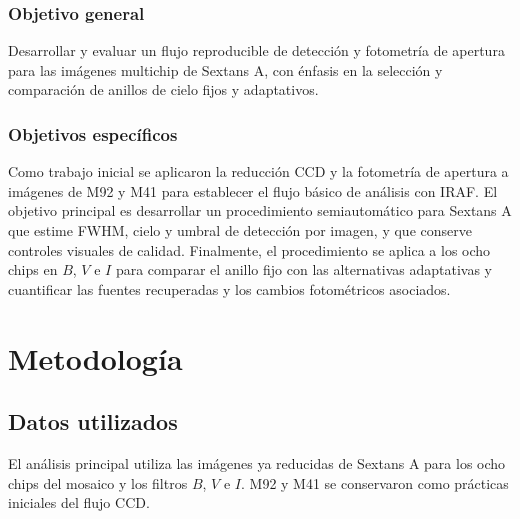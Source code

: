 \documentclass[12pt,letterpaper,oneside]{book}
\begin{document}
\subsection{Objetivo general}

Desarrollar y evaluar un flujo reproducible de detección y fotometría de apertura para las imágenes multichip de Sextans A, con énfasis en la selección y comparación de anillos de cielo fijos y adaptativos.


\subsection{Objetivos específicos}

Como trabajo inicial se aplicaron la reducción CCD y la fotometría de apertura a imágenes de M92 y M41 para establecer el flujo básico de análisis con IRAF. El objetivo principal es desarrollar un procedimiento semiautomático para Sextans A que estime FWHM, cielo y umbral de detección por imagen, y que conserve controles visuales de calidad. Finalmente, el procedimiento se aplica a los ocho chips en $B$, $V$ e $I$ para comparar el anillo fijo con las alternativas adaptativas y cuantificar las fuentes recuperadas y los cambios fotométricos asociados.


\chapter{Metodología}



\section{Datos utilizados}

El análisis principal utiliza las imágenes ya reducidas de Sextans A para los ocho chips del mosaico y los filtros $B$, $V$ e $I$. M92 y M41 se conservaron como prácticas iniciales del flujo CCD.
\end{document}
